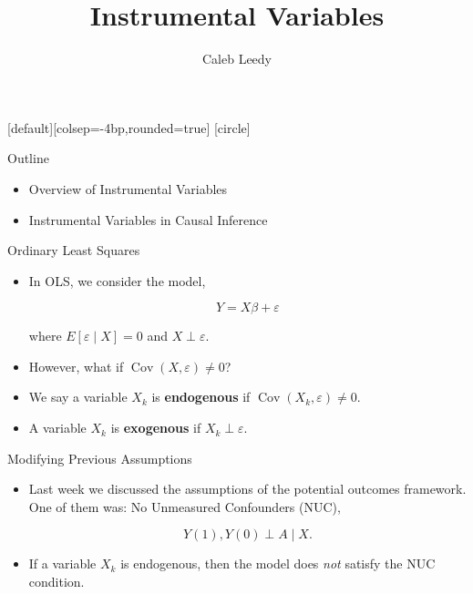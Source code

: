 \documentclass[handout]{beamer} %
\author[CL]{Caleb Leedy}
\title[IV]{Instrumental Variables}
\DeclareMathOperator*{\Cov}{Cov}
\begin{document}
\everymath{\displaystyle}
[default][colsep=-4bp,rounded=true]
[circle]
\frame{\titlepage}

\begin{frame}{Outline}

{

\begin{itemize}
    \item<1> Overview of Instrumental Variables
    \item<0> Instrumental Variables in Causal Inference
\end{itemize}
}

\end{frame}

\begin{frame}{Ordinary Least Squares}

\begin{itemize}
    \item<1-> In OLS, we consider the model,

      \begin{equation}\label{eq:ols}
      Y = X\beta + \varepsilon
      \end{equation}

      where $E[\varepsilon \mid X] = 0$ and $X \perp \varepsilon$.
    \item<2-> However, what if $\Cov(X, \varepsilon) \neq 0$?
    \item<3-> We say a variable $X_k$ is \textbf{endogenous} if $\Cov(X_k,
      \varepsilon) \neq 0$.
    \item<3-> A variable $X_k$ is \textbf{exogenous} if $X_k \perp \varepsilon$.
\end{itemize}

\end{frame}

\begin{frame}{Modifying Previous Assumptions}

\begin{itemize}
    \item Last week we discussed the assumptions of the potential outcomes
      framework. One of them was: No Unmeasured Confounders (NUC),

      \[Y(1), Y(0) \perp A \mid X.\]

    \item If a variable $X_k$ is endogenous, then the model does \textit{not} 
      satisfy the NUC condition.
\end{itemize}

\end{frame}
\end{document}
